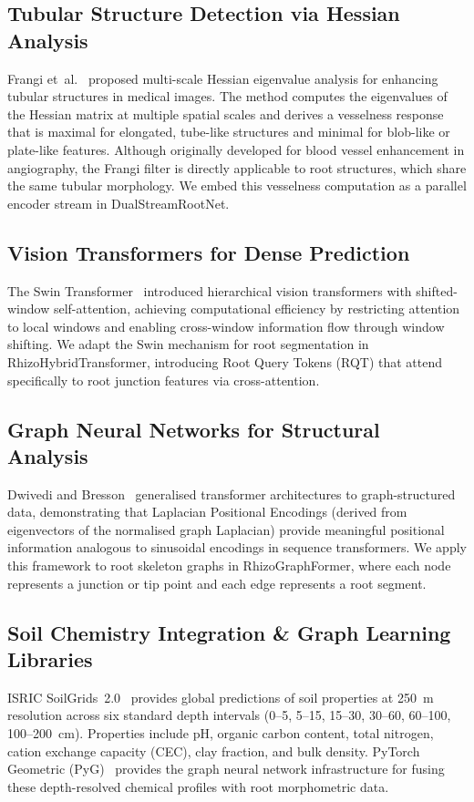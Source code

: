 \documentclass[final,3p,times,nonatbib]{elsarticle}
\begin{document}
\subsection{Tubular Structure Detection via Hessian Analysis}
Frangi et~al.~\cite{frangi1998multiscale} proposed multi-scale Hessian eigenvalue analysis for enhancing tubular structures in medical images. The method computes the eigenvalues of the Hessian matrix at multiple spatial scales and derives a vesselness response that is maximal for elongated, tube-like structures and minimal for blob-like or plate-like features. Although originally developed for blood vessel enhancement in angiography, the Frangi filter is directly applicable to root structures, which share the same tubular morphology. We embed this vesselness computation as a parallel encoder stream in DualStreamRootNet.

\subsection{Vision Transformers for Dense Prediction}
The Swin Transformer~\cite{liu2021swin} introduced hierarchical vision transformers with shifted-window self-attention, achieving computational efficiency by restricting attention to local windows and enabling cross-window information flow through window shifting. We adapt the Swin mechanism for root segmentation in RhizoHybridTransformer, introducing Root Query Tokens (RQT) that attend specifically to root junction features via cross-attention.

\subsection{Graph Neural Networks for Structural Analysis}
Dwivedi and Bresson~\cite{dwivedi2021generalization} generalised transformer architectures to graph-structured data, demonstrating that Laplacian Positional Encodings (derived from eigenvectors of the normalised graph Laplacian) provide meaningful positional information analogous to sinusoidal encodings in sequence transformers. We apply this framework to root skeleton graphs in RhizoGraphFormer, where each node represents a junction or tip point and each edge represents a root segment.

\subsection{Soil Chemistry Integration \& Graph Learning Libraries}
ISRIC SoilGrids~2.0~\cite{soilgrids2021} provides global predictions of soil properties at 250~m resolution across six standard depth intervals (0--5, 5--15, 15--30, 30--60, 60--100, 100--200~cm). Properties include pH, organic carbon content, total nitrogen, cation exchange capacity (CEC), clay fraction, and bulk density. PyTorch Geometric (PyG)~\cite{fey2019pyg} provides the graph neural network infrastructure for fusing these depth-resolved chemical profiles with root morphometric data.
\end{document}
